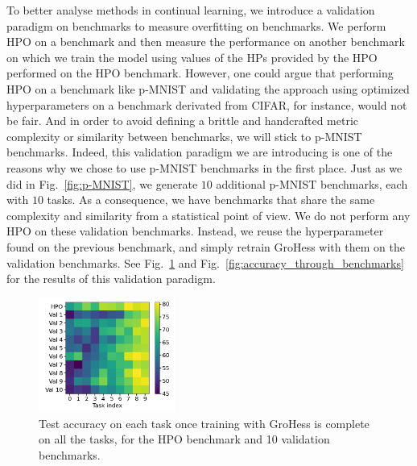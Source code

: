 \documentclass[11pt]{article}
\begin{document}
\vspace{2mm}
\noindent
To better analyse methods in continual learning, we introduce a validation paradigm on benchmarks to measure overfitting on benchmarks. We perform HPO on a benchmark and then measure the performance on another benchmark on which we train the model using values of the HPs provided by the HPO performed on the HPO benchmark. However, one could argue that performing HPO on a benchmark like p-MNIST and validating the approach using optimized hyperparameters on a benchmark derivated from CIFAR, for instance, would not be fair. And in order to avoid defining a brittle and handcrafted metric complexity or similarity between benchmarks, we will stick to p-MNIST benchmarks. Indeed, this validation paradigm we are introducing is one of the reasons why we chose to use p-MNIST benchmarks in the first place. Just as we did in Fig.~\ref{fig:p-MNIST}, we generate $10$ additional p-MNIST benchmarks, each with $10$ tasks. As a consequence, we have benchmarks that share the same complexity and similarity from a statistical point of view. We do not perform any HPO on these validation benchmarks. Instead, we reuse the hyperparameter found on the previous benchmark, and simply retrain GroHess with them on the validation benchmarks. See Fig.~\ref{fig:val_accs_matrix} and Fig.~\ref{fig:accuracy_through_benchmarks} for the results of this validation paradigm.

\begin{figure}
    \centering
    \includegraphics[width=0.4\textwidth]{images/val_accs_matrix.png}
    \caption{Test accuracy on each task once training with GroHess is complete on all the tasks, for the HPO benchmark and 10 validation benchmarks.}
    \label{fig:val_accs_matrix}
\end{figure}
\end{document}
